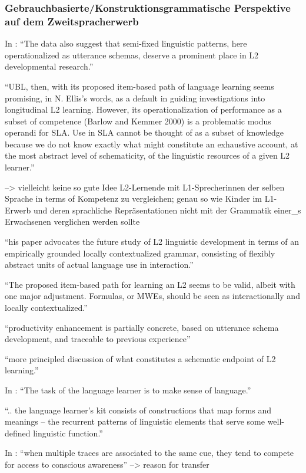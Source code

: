 \subsubsection{Gebrauchbasierte/Konstruktionsgrammatische Perspektive auf dem Zweitspracherwerb}

In \cite{Eskildsen08}: ``The data also suggest that semi-fixed linguistic
patterns, here operationalized as utterance schemas, deserve a prominent place
in L2 developmental research.''

``UBL, then, with its proposed item-based path of language learning seems
promising, in N. Ellis’s words, as a default in guiding investigations into
longitudinal L2 learning. However, its operationalization of performance as a
subset of competence (Barlow and Kemmer 2000) is a problematic modus
operandi for SLA. Use in SLA cannot be thought of as a subset of knowledge
because we do not know exactly what might constitute an exhaustive
account, at the most abstract level of schematicity, of the linguistic resources
of a given L2 learner.''

--> vielleicht keine so gute Idee L2-Lernende mit L1-Sprecherinnen der selben Sprache in terms of Kompetenz zu vergleichen; genau so wie Kinder im L1-Erwerb und deren sprachliche Repräsentationen nicht mit der Grammatik einer\_s Erwachsenen verglichen werden sollte

``his paper advocates the future study of L2 linguistic
development in terms of an empirically grounded locally contextualized
grammar, consisting of flexibly abstract units of actual language use in
interaction.''

``The proposed item-based path for learning an L2 seems to be valid, albeit
with one major adjustment. Formulas, or MWEs, should be seen as
interactionally and locally contextualized.''

``productivity enhancement is partially concrete, based on utterance schema
development, and traceable to previous experience''

``more principled discussion of what constitutes a schematic endpoint of L2 learning.''

In \cite{Ellis04}: ``The task of the language learner is to make sense of language.''

``.. the language learner's kit consists of constructions that map forms and meanings -- the recurrent patterns of linguistic elements that serve some well-defined linguistic function.''

In \cite{Ellis06}: ``when multiple
traces are associated to the same cue, they tend to compete for access to
conscious awareness'' --> reason for transfer


